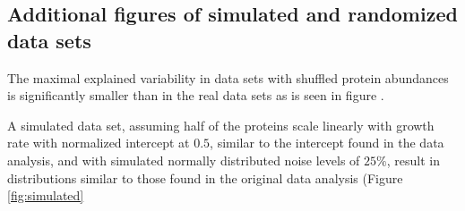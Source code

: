 \subsection{Additional figures of simulated and randomized data sets}
The maximal explained variability in data sets with shuffled protein abundances is significantly smaller than in the real data sets as is seen in figure \label{fig:shuffledexpvar}.

A simulated data set, assuming half of the proteins scale linearly with growth rate with normalized intercept at $0.5$, similar to the intercept found in the data analysis, and with simulated normally distributed noise levels of $25\%$, result in distributions similar to those found in the original data analysis (Figure \ref{fig:simulated}